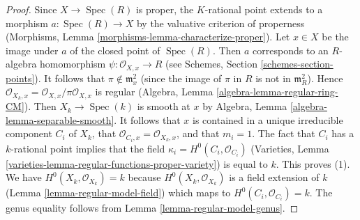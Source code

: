 \documentclass[10pt,a4paper]{amsart}
\theoremstyle{plain}
\theoremstyle{definition}
\theoremstyle{remark}
\numberwithin{equation}{subsection}
\def\Spec{\mathop{\mathrm{Spec}}}
\begin{document}
\begin{proof}
Since $X \to \Spec(R)$ is proper, the $K$-rational point extends to
a morphism $a : \Spec(R) \to X$ by the valuative criterion of properness
(Morphisms, Lemma \ref{morphisms-lemma-characterize-proper}).
Let $x \in X$ be the image under $a$ of the closed point of $\Spec(R)$.
Then $a$ corresponds to an $R$-algebra homomorphism
$\psi : \mathcal{O}_{X, x} \to R$
(see Schemes, Section \ref{schemes-section-points}).
It follows that $\pi \not \in \mathfrak m_x^2$ (since the image
of $\pi$ in $R$ is not in $\mathfrak m_R^2$).
Hence $\mathcal{O}_{X_k, x} = \mathcal{O}_{X, x}/\pi \mathcal{O}_{X, x}$
is regular (Algebra, Lemma \ref{algebra-lemma-regular-ring-CM}).
Then $X_k \to \Spec(k)$ is smooth at $x$ by
Algebra, Lemma \ref{algebra-lemma-separable-smooth}.
It follows that $x$ is contained in a unique irreducible component
$C_i$ of $X_k$, that $\mathcal{O}_{C_i, x} = \mathcal{O}_{X_k, x}$,
and that $m_i = 1$. The fact that $C_i$ has a
$k$-rational point implies that the field
$\kappa_i = H^0(C_i, \mathcal{O}_{C_i})$
(Varieties, Lemma \ref{varieties-lemma-regular-functions-proper-variety})
is equal to $k$. This proves (1). We have
$H^0(X_k, \mathcal{O}_{X_k}) = k$
because $H^0(X_k, \mathcal{O}_{X_k})$ is a field
extension of $k$ (Lemma \ref{lemma-regular-model-field})
which maps to $H^0(C_i, \mathcal{O}_{C_i}) = k$.
The genus equality follows from Lemma \ref{lemma-regular-model-genus}.
\end{proof}
\end{document}

